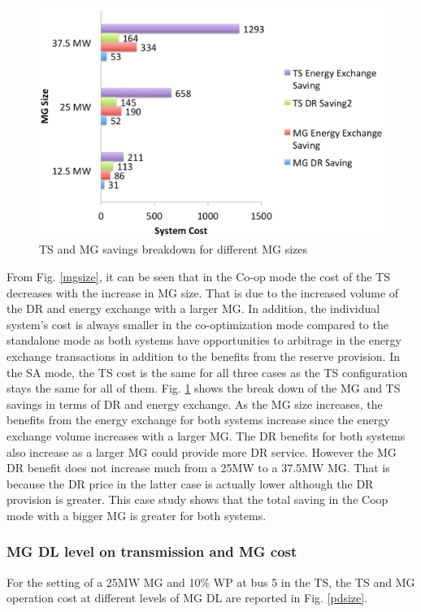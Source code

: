 \begin{figure}[H]
\centering
\includegraphics[scale=0.25]{mgsize2.png}
\caption{TS and MG savings breakdown for different MG sizes}
\label{mgsize2}
\end{figure}

From Fig. \ref{mgsize}, it can be seen that in the Co-op mode the cost of the TS decreases with the increase in MG size. That is due to the increased volume of the DR and energy exchange with a larger MG. In addition, the individual system's cost is always smaller in the co-optimization mode compared to the standalone mode as both systems have opportunities to arbitrage in the energy exchange transactions in addition to the benefits from the reserve provision. In the SA mode, the TS cost is the same for all three cases as the TS configuration stays the same for all of them. Fig. \ref{mgsize2} shows the break down of the MG and TS savings in terms of DR and energy exchange. As the MG size increases, the benefits from the energy exchange for both systems increase since the energy exchange volume increases with a larger MG. The DR benefits for both systems also increase as a larger MG could provide more DR service. However the MG DR benefit does not increase much from a 25MW to a 37.5MW MG. That is because the DR price in the latter case is actually lower although the DR provision is greater. This case study shows that the total saving in the Coop mode with a bigger MG is greater for both systems.

\subsubsection{MG DL level on transmission and MG cost}
For the setting of a 25MW MG  and 10\% WP at bus 5 in the TS, the TS and MG operation cost at different levels of MG DL are reported in Fig. \ref{pdsize}.

